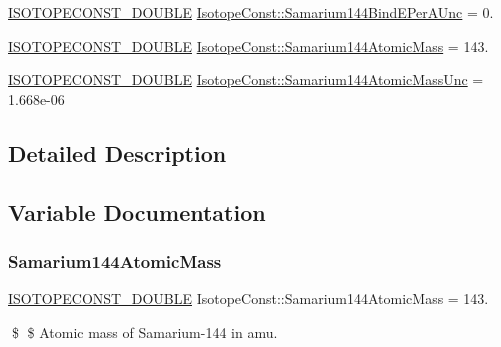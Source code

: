 \begin{DoxyCompactItemize}
\mbox{\hyperlink{group___isotope_const-_macros_ga8f45a7272ce02c0b4c65c44636ed719a}{I\+S\+O\+T\+O\+P\+E\+C\+O\+N\+S\+T\+\_\+\+D\+O\+U\+B\+LE}} \mbox{\hyperlink{group___isotope_const-_samarium-_sm144_ga2255039ff21fd7a5a99e8f098f54ea11}{Isotope\+Const\+::\+Samarium144\+Bind\+E\+Per\+A\+Unc}} = 0.
\item 
\mbox{\hyperlink{group___isotope_const-_macros_ga8f45a7272ce02c0b4c65c44636ed719a}{I\+S\+O\+T\+O\+P\+E\+C\+O\+N\+S\+T\+\_\+\+D\+O\+U\+B\+LE}} \mbox{\hyperlink{group___isotope_const-_samarium-_sm144_ga95c874824ff29add4e56d720a2e771c2}{Isotope\+Const\+::\+Samarium144\+Atomic\+Mass}} = 143.
\item 
\mbox{\hyperlink{group___isotope_const-_macros_ga8f45a7272ce02c0b4c65c44636ed719a}{I\+S\+O\+T\+O\+P\+E\+C\+O\+N\+S\+T\+\_\+\+D\+O\+U\+B\+LE}} \mbox{\hyperlink{group___isotope_const-_samarium-_sm144_gac0bb47fa0116f4640f4b5d8c62e631e2}{Isotope\+Const\+::\+Samarium144\+Atomic\+Mass\+Unc}} = 1.\+668e-\/06
\end{DoxyCompactItemize}


\subsection{Detailed Description}


\subsection{Variable Documentation}
\mbox{\label{group___isotope_const-_samarium-_sm144_ga95c874824ff29add4e56d720a2e771c2}} 
\subsubsection{\texorpdfstring{Samarium144\+Atomic\+Mass}{Samarium144AtomicMass}}
{\footnotesize\ttfamily \mbox{\hyperlink{group___isotope_const-_macros_ga8f45a7272ce02c0b4c65c44636ed719a}{I\+S\+O\+T\+O\+P\+E\+C\+O\+N\+S\+T\+\_\+\+D\+O\+U\+B\+LE}} Isotope\+Const\+::\+Samarium144\+Atomic\+Mass = 143.}

\$ \$ Atomic mass of Samarium-\/144 in amu. \mbox{\label{group___isotope_const-_samarium-_sm144_gac0bb47fa0116f4640f4b5d8c62e631e2}} 
